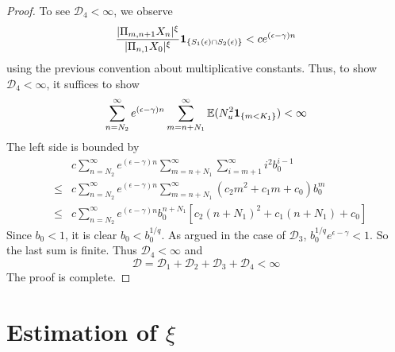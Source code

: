 \begin{proof}
To see $\mathscr D_4 < \infty$, we observe
\[
  {
    |\Pi_{m, n+1} X_n |^{\xi}
    \over
    |\Pi_{n, 1} X_0 |^{\xi}        
  } \mathbf{1}_{\{S_1(\epsilon) \cap S_2(\epsilon)\}}
  <
  c e^{(\epsilon - \gamma) n} 
\]
using the previous convention about multiplicative constants. Thus, to
show $\mathscr D_4 < \infty$, it suffices to show
\[
\sum_{n=N_2}^\infty
e^{(\epsilon - \gamma) n} 
\sum_{m=n+N_1}^\infty
\mathbb{E} (N_u^2 \mathbf{1}_{\{m < K_1\}}) < \infty
\]
The left side is bounded by
\begin{eqnarray*}
  &&
  c \sum_{n=N_2}^\infty
  e^{(\epsilon - \gamma) n} 
  \sum_{m=n+N_1}^\infty
  \sum_{i=m+1}^\infty
  i^2 b_0^{i-1} \\
  &\leq&
  c \sum_{n=N_2}^\infty
  e^{(\epsilon - \gamma) n}   
  \sum_{m=n+N_1}^\infty
  (c_2 m^2 + c_1 m + c_0) b_0^m \\
  &\leq&
  c \sum_{n=N_2}^\infty
  e^{(\epsilon - \gamma) n} b_0^{n + N_1}
  [c_2 (n + N_1)^2 + c_1 (n + N_1) + c_0]
\end{eqnarray*}
Since $b_0 < 1$, it is clear $b_0 < b_0^{1/q}$.
As argued in the case of $\mathscr D_3$,
$b_0^{1/q} e^{\epsilon - \gamma} < 1$. So the last sum is finite.
Thus $\mathscr D_4 < \infty$ and
\[
\mathscr D
=
\mathscr D_1 + \mathscr D_2 + \mathscr D_3 + \mathscr D_4
< \infty
\]
The proof is complete.
\end{proof}

\section[Estimation of tail index]{Estimation of $\xi$}
